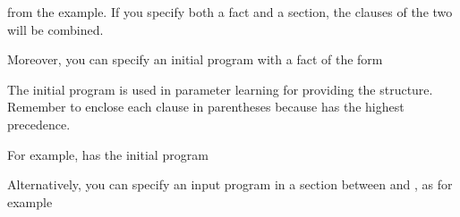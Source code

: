 \documentclass[letterpaper,10pt,english]{sphinxmanual}
\begin{document}
\sphinxAtStartPar
from the  example.
If you specify both a  fact and a section, the clauses of the two will be combined.

\sphinxAtStartPar
Moreover, you can specify an initial program with a fact of the form

\begin{sphinxVerbatim}[commandchars=\\\{\}]
    
\end{sphinxVerbatim}

\sphinxAtStartPar
The initial program is used in parameter learning for providing the structure.
Remember to enclose each clause in parentheses because \sphinxcode{\sphinxupquote{:\sphinxhyphen{}}} has the highest precedence.

\sphinxAtStartPar
For example,  has the initial program

\begin{sphinxVerbatim}[commandchars=\\\{\}]
    \PYG{p}{[} 
 
 
   \PYG{p}{]}
\end{sphinxVerbatim}

\sphinxAtStartPar
Alternatively, you can specify an input program in a section between  and , as for example
\end{document}
